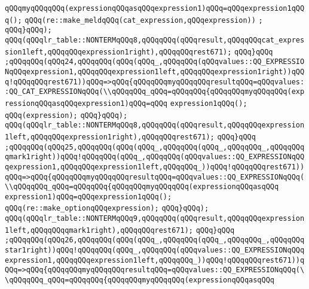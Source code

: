 \verb|qQQqmyqQQqqQQq(expressionqQQqasqQQqexpression1)qQQq=qQQqexpression1qQQq();|\newline
\verb|qQQq(re::make_meldqQQq(cat_expression,qQQqexpression))|\newline
\verb|;|\newline
\verb|qQQq}qQQq);|\newline
\verb|qQQq(qQQqlr_table::NONTERMqQQq8,qQQqqQQq(qQQqresult,qQQqqQQqcat_expression1left,qQQqqQQqexpression1right),qQQqqQQqrest671);|\newline
\verb|qQQq}qQQq|\newline
\verb|;qQQqqQQq(qQQq24,qQQqqQQq(qQQq(qQQq_,qQQqqQQq(qQQqvalues::QQ_EXPRESSIONqQQqexpression1,qQQqqQQqexpression1left,qQQqqQQqexpression1right))qQQq!qQQqqQQqrest671))qQQq=>qQQq{qQQqqQQqmyqQQqqQQqresultqQQq=qQQqvalues::QQ_CAT_EXPRESSIONqQQq(\\qQQqqQQq_qQQq=qQQqqQQq{qQQqqQQqmyqQQqqQQq(expressionqQQqasqQQqexpression1)qQQq=qQQq|\newline
\verb|expression1qQQq();|\newline
\verb|qQQq(expression);|\newline
\verb|qQQq}qQQq);|\newline
\verb|qQQq(qQQqlr_table::NONTERMqQQq8,qQQqqQQq(qQQqresult,qQQqqQQqexpression1left,qQQqqQQqexpression1right),qQQqqQQqrest671);|\newline
\verb|qQQq}qQQq|\newline
\verb|;qQQqqQQq(qQQq25,qQQqqQQq(qQQq(qQQq_,qQQqqQQq(qQQq_,qQQqqQQq_,qQQqqQQqqmark1right))qQQq!qQQqqQQq(qQQq_,qQQqqQQq(qQQqvalues::QQ_EXPRESSIONqQQqexpression1,qQQqqQQqexpression1left,qQQqqQQq_))qQQq!qQQqqQQqrest671))qQQq=>qQQq{qQQqqQQqmyqQQqqQQqresultqQQq=qQQqvalues::QQ_EXPRESSIONqQQq(\\qQQqqQQq_qQQq=qQQqqQQq{qQQqqQQqmyqQQqqQQq(expressionqQQqasqQQq|\newline
\verb|expression1)qQQq=qQQqexpression1qQQq();|\newline
\verb|qQQq(re::make_optionqQQqexpression);|\newline
\verb|qQQq}qQQq);|\newline
\verb|qQQq(qQQqlr_table::NONTERMqQQq9,qQQqqQQq(qQQqresult,qQQqqQQqexpression1left,qQQqqQQqqmark1right),qQQqqQQqrest671);|\newline
\verb|qQQq}qQQq|\newline
\verb|;qQQqqQQq(qQQq26,qQQqqQQq(qQQq(qQQq_,qQQqqQQq(qQQq_,qQQqqQQq_,qQQqqQQqstar1right))qQQq!qQQqqQQq(qQQq_,qQQqqQQq(qQQqvalues::QQ_EXPRESSIONqQQqexpression1,qQQqqQQqexpression1left,qQQqqQQq_))qQQq!qQQqqQQqrest671))qQQq=>qQQq{qQQqqQQqmyqQQqqQQqresultqQQq=qQQqvalues::QQ_EXPRESSIONqQQq(\\qQQqqQQq_qQQq=qQQqqQQq{qQQqqQQqmyqQQqqQQq(expressionqQQqasqQQq|\newline
